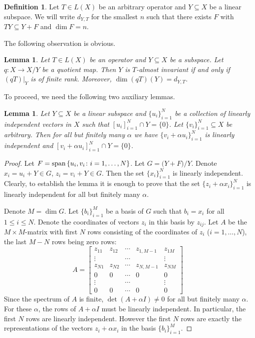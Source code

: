 \documentclass[12pt]{amsart}
\theoremstyle{plain}
\newtheorem{lemma}[theorem]{Lemma}
\theoremstyle{definition}
\newtheorem{definition}[theorem]{Definition}
\theoremstyle{remark}
\begin{document}
\begin{definition}
 Let $T\in L(X)$ be an arbitrary operator and $Y\subseteq X$ be a linear subspace. We will write $d_{Y,T}$ for the smallest $n$ such that there exists $F$ with $TY\subseteq Y+F$ and $\dim F=n$.
\end{definition}

The following observation is obvious.

\begin{lemma}\label{quotient}
Let $T\in L(X)$ be an operator and $Y\subseteq X$ be a subspace. Let $q:X\to X/Y$ be a quotient map. Then $Y$ is $T$-almost invariant if and only if $(qT)|_Y$ is of finite rank. Moreover, $\dim(qT)(Y)=d_{Y,T}$.
\end{lemma}

To proceed, we need the following two auxiliary lemmas.

\begin{lemma}\label{small-indep}
 Let $Y\subseteq X$ be a linear subspace and $\{u_i\}_{i=1}^N$ be a collection 
 of linearly independent vectors in $X$ such that $[u_i]_{i=1}^N\cap Y=\{0\}$. Let $\{v_i\}_{i=1}^N\subseteq X$ be arbitrary. Then for all but finitely many $\alpha$ we have $\{v_i+\alpha u_i\}_{i=1}^N$ is linearly independent and $[v_i+\alpha u_i]_{i=1}^N\cap Y=\{0\}$.
\end{lemma}
\begin{proof}
 Let $F={{\rm span}\,}\{u_i, v_i\colon i=1,\dots,N\}$. Let $G=\big(Y+F\big)/Y$. Denote
 $x_i=u_i+Y\in G$, $z_i=v_i+Y\in G$. Then the set $\{x_i\}_{i=1}^N$ is 
 linearly 
 independent. Clearly, to establish the lemma it is enough to prove that 
 the set $\{z_i+\alpha x_i\}_{i=1}^N$ is linearly independent for all but finitely many $\alpha$.
 
 Denote $M=\dim G$. Let $\{b_i\}_{i=1}^M$ be a basis of $G$ such that 
 $b_i=x_i$ 
 for all $1{\leqslant} i{\leqslant} N$.
 Denote the coordinates of vectors $z_i$ in this basis by $z_{ij}$. 
 Let $A$ be the $M\times M$-matrix with first $N$
 rows consisting of the coordinates of $z_i$ ($i=1,\dots,N$), the last $M-N$
 rows being zero rows:
 \begin{displaymath}
  A=\left[\begin{array}{ccccc}
           z_{11} & z_{12} & \cdots & z_{1,M-1} & z_{1M}\\
           \vdots &        & \cdots & & \vdots\\
           z_{N1} & z_{N2} & \cdots & z_{N,M-1} & z_{NM}\\
                0 &      0 & \cdots & 0 & 0\\
           \vdots &        & \cdots & & \vdots\\
                0 &      0 & \cdots & 0 & 0
          \end{array}
    \right]
 \end{displaymath}
 Since the spectrum of $A$ is finite, $\det(A+\alpha I)\ne 0$ for all but finitely many $\alpha$. For these $\alpha$, the
 rows of $A+\alpha I$ must be linearly independent. In particular, the first
 $N$ rows are linearly independent. However the first $N$ rows are exactly the 
 representations of the vectors $z_i+\alpha x_i$ in the basis 
 $\{b_i\}_{i=1}^M$.
\end{proof}
\end{document}
